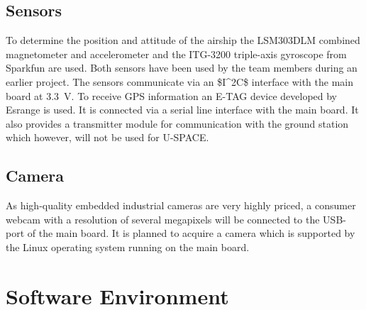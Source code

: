 \subsection{Sensors}

To determine the position and attitude of the airship the LSM303DLM \cite{LSM303:datasheet} combined magnetometer and accelerometer and the ITG-3200 triple-axis gyroscope \cite{ITG-3200:datasheet} from Sparkfun are used. Both sensors have been used by the team members during an earlier project. The sensors communicate via an \ac{$I^2C$} interface with the main board at 3.3~V. To receive \ac{GPS} information an E-TAG device developed by Esrange is
used. It is connected via a serial line interface with the main board. It also provides a transmitter module for communication with the ground station which however, will not be used for U-SPACE.

\subsection{Camera}

As high-quality embedded industrial cameras are very highly priced, a consumer webcam with a resolution of several megapixels will be connected to the \ac{USB}-port of the main board. It is planned to acquire a camera which is supported by the Linux operating system running on the main board.


\FloatBarrier
\section{Software Environment}

